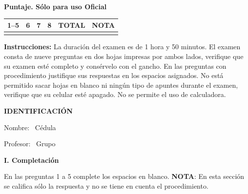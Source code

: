 \documentclass[11pt]{article}
\begin{document}
\examheader

\vspace{4pt}
\noindent
\begin{minipage}[t]{0.62\linewidth}
\textbf{Puntaje. Sólo para uso Oficial}\\[4pt]
\begin{tabular}{|c|c|c|c|c|c|}
\hline
1--5 & 6 & 7 & 8 & \textbf{TOTAL} & \textbf{NOTA} \\ \hline
 & & & & & \\ \hline
\end{tabular}
\end{minipage}

\vspace{6pt}
\noindent\textbf{Instrucciones:} La duración del examen es de 1 hora y 50 minutos. El examen consta de nueve preguntas en dos hojas impresas por ambos lados, verifique que su examen esté completo y consérvelo con el gancho. En las preguntas con procedimiento justifique sus respuestas en los espacios asignados. No está permitido sacar hojas en blanco ni ningún tipo de apuntes durante el examen, verifique que su celular esté apagado. No se permite el uso de calculadora.

\vspace{6pt}
\noindent\textbf{IDENTIFICACIÓN}

\vspace{8pt}
\noindent Nombre: \dotfill\ Cédula \dotfill

\vspace{4pt}
\noindent Profesor: \dotfill\ Grupo \dotfill

\vspace{10pt}
\begin{center}\textbf{I. Completación}\end{center}
\noindent En las preguntas 1 a 5 complete los espacios en blanco. \textbf{NOTA}: En esta sección se califica sólo la respuesta y no se tiene en cuenta el procedimiento.
\end{document}
